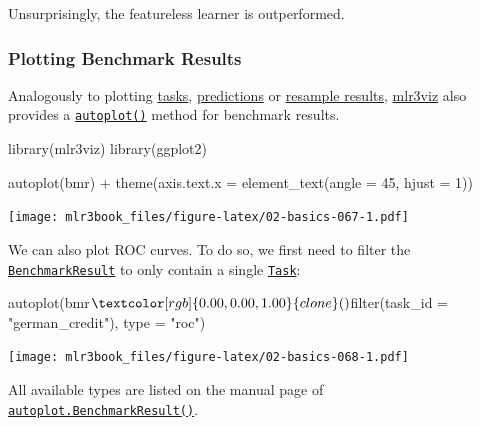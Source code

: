 \documentclass[]{article}
\newenvironment{Shaded}{}{}
\newcommand{\DataTypeTok}[1]{#1}
\newcommand{\DecValTok}[1]{#1}
\newcommand{\KeywordTok}[1]{\textcolor[rgb]{0.00,0.00,1.00}{#1}}
\newcommand{\NormalTok}[1]{#1}
\newcommand{\OperatorTok}[1]{#1}
\newcommand{\StringTok}[1]{\textcolor[rgb]{0.00,0.50,0.50}{#1}}
\renewenvironment{Shaded} {\begin{snugshade}\small} {\end{snugshade}}
\begin{document}
Unsurprisingly, the featureless learner is outperformed.

\hypertarget{autoplot-benchmarkresult}{%
\subsubsection{Plotting Benchmark Results}\label{autoplot-benchmarkresult}}

Analogously to plotting \protect\hyperlink{autoplot-task}{tasks}, \protect\hyperlink{autoplot-prediction}{predictions} or \protect\hyperlink{autoplot-resampleresult}{resample results}, \href{https://mlr3viz.mlr-org.com}{mlr3viz} also provides a \href{https://www.rdocumentation.org/packages/ggplot2/topics/autoplot}{\texttt{autoplot()}} method for benchmark results.

\begin{Shaded}
\begin{Highlighting}[]
\KeywordTok{library}\NormalTok{(mlr3viz)}
\KeywordTok{library}\NormalTok{(ggplot2)}

\KeywordTok{autoplot}\NormalTok{(bmr) }\OperatorTok{+}\StringTok{ }\KeywordTok{theme}\NormalTok{(}\DataTypeTok{axis.text.x =} \KeywordTok{element_text}\NormalTok{(}\DataTypeTok{angle =} \DecValTok{45}\NormalTok{, }\DataTypeTok{hjust =} \DecValTok{1}\NormalTok{))}
\end{Highlighting}
\end{Shaded}

\texttt{[image: mlr3book\_files/figure-latex/02-basics-067-1.pdf]}

We can also plot ROC curves.
To do so, we first need to filter the \href{https://mlr3.mlr-org.com/reference/BenchmarkResult.html}{\texttt{BenchmarkResult}} to only contain a single \href{https://mlr3.mlr-org.com/reference/Task.html}{\texttt{Task}}:

\begin{Shaded}
\begin{Highlighting}[]
\KeywordTok{autoplot}\NormalTok{(bmr}\OperatorTok{$}\KeywordTok{clone}\NormalTok{()}\OperatorTok{$}\KeywordTok{filter}\NormalTok{(}\DataTypeTok{task_id =} \StringTok{"german_credit"}\NormalTok{), }\DataTypeTok{type =} \StringTok{"roc"}\NormalTok{)}
\end{Highlighting}
\end{Shaded}

\texttt{[image: mlr3book\_files/figure-latex/02-basics-068-1.pdf]}

All available types are listed on the manual page of \href{https://mlr3viz.mlr-org.com/reference/autoplot.BenchmarkResult.html}{\texttt{autoplot.BenchmarkResult()}}.
\end{document}
